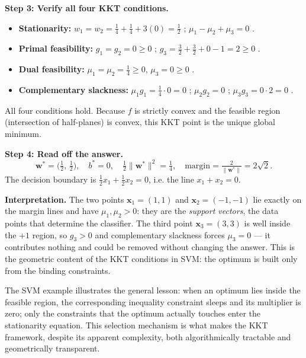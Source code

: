 \begin{example}
\begin{solution}
\noindent\textbf{Step 3: Verify all four KKT conditions.}
\begin{itemize}\setlength{\itemsep}{2pt}
  \item \textbf{Stationarity:} $w_1 = w_2 = \tfrac{1}{4} + \tfrac{1}{4} + 3(0) = \tfrac{1}{2}$ \checkmark; \;\; $\mu_1 - \mu_2 + \mu_3 = 0$ \checkmark.
  \item \textbf{Primal feasibility:} $g_1 = g_2 = 0 \geq 0$ \checkmark; \;\; $g_3 = \tfrac{3}{2} + \tfrac{3}{2} + 0 - 1 = 2 \geq 0$ \checkmark.
  \item \textbf{Dual feasibility:} $\mu_1 = \mu_2 = \tfrac{1}{4} \geq 0$, $\mu_3 = 0 \geq 0$ \checkmark.
  \item \textbf{Complementary slackness:} $\mu_1 g_1 = \tfrac{1}{4}\cdot 0 = 0$ \checkmark; \;\; $\mu_2 g_2 = 0$ \checkmark; \;\; $\mu_3 g_3 = 0\cdot 2 = 0$ \checkmark.
\end{itemize}
All four conditions hold. Because $f$ is strictly convex and the feasible region (intersection of half-planes) is convex, this KKT point is the unique global minimum.

\noindent\textbf{Step 4: Read off the answer.}
\[
\boxed{\;\mathbf{w}^* = \bigl(\tfrac{1}{2},\,\tfrac{1}{2}\bigr), \quad b^* = 0, \quad \tfrac{1}{2}\|\mathbf{w}^*\|^2 = \tfrac{1}{4}, \quad \text{margin} = \tfrac{2}{\|\mathbf{w}^*\|} = 2\sqrt{2}.\;}
\]
The decision boundary is $\tfrac{1}{2}x_1 + \tfrac{1}{2}x_2 = 0$, i.e. the line $x_1 + x_2 = 0$.

\noindent\textbf{Interpretation.} The two points $\mathbf{x}_1 = (1,1)$ and $\mathbf{x}_2 = (-1,-1)$ lie exactly on the margin lines and have $\mu_1, \mu_2 > 0$: they are the \textit{support vectors}, the data points that determine the classifier. The third point $\mathbf{x}_3 = (3,3)$ is well inside the $+1$ region, so $g_3 > 0$ and complementary slackness forces $\mu_3 = 0$ --- it contributes nothing and could be removed without changing the answer. This is the geometric content of the KKT conditions in SVM: the optimum is built only from the binding constraints.
\end{solution}
\end{example}
\exampleline

\noindent The SVM example illustrates the general lesson: when an optimum lies inside the feasible region, the corresponding inequality constraint sleeps and its multiplier is zero; only the constraints that the optimum actually touches enter the stationarity equation. This selection mechanism is what makes the KKT framework, despite its apparent complexity, both algorithmically tractable and geometrically transparent.















